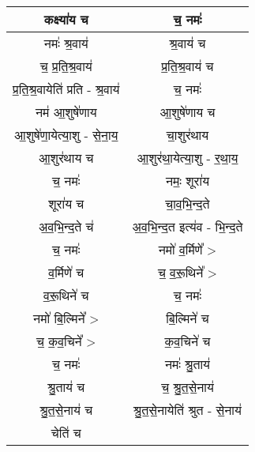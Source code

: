 {\begin{longtable}{|c|c|}
\hline
कक्ष्या॑य च                    & च॒ नमः॑\\
\hline
नमः॑ श्र॒वाय॑                   & श्र॒वाय॑ च\\
\hline
च॒ प्र॒ति॒श्र॒वाय॑                 & प्र॒ति॒श्र॒वाय॑ च\\
\hline
प्र॒ति॒श्र॒वायेति॑ प्रति - श्र॒वाय॑    & च॒ नमः॑\\
\hline
नम॑ आ॒शुषे॑णाय                   & आ॒शुषे॑णाय च\\
\hline
आ॒शुषे॑णा॒येत्या॒शु - से॒ना॒य॒           & चा॒शुर॑थाय\\
\hline
आ॒शुर॑थाय च                    & आ॒शुर॑था॒येत्या॒शु - र॒था॒य॒\\
\hline
च॒ नमः॑                       & नमः॒ शूरा॑य\\
\hline
शूरा॑य च                      & चा॒व॒भि॒न्द॒ते\\
\hline
अ॒व॒भि॒न्द॒ते च॑                   & अ॒व॒भि॒न्द॒त इत्य॑व - भि॒न्द॒ते\\
\hline
च॒ नमः॑                       & नमो॑ व॒र्मिणे᳚ >\\
\hline
व॒र्मिणे॑ च                     & च॒ व॒रू॒थिने᳚ >\\
\hline
व॒रू॒थिने॑ च                     & च॒ नमः॑\\
\hline
नमो॑ बि॒ल्मिने᳚ >                & बि॒ल्मिने॑ च\\
\hline
च॒ क॒व॒चिने᳚ >                   & क॒व॒चिने॑ च\\
\hline
च॒ नमः॑                       & नमः॑ श्रु॒ताय॑\\
\hline
श्रु॒ताय॑ च                     & च॒ श्रु॒त॒से॒नाय॑\\
\hline
श्रु॒त॒से॒नाय॑ च                   & श्रु॒त॒से॒नायेति॑ श्रुत - से॒नाय॑\\
\hline
चेति॑ च                       & \\
\hline
\end{longtable}
}